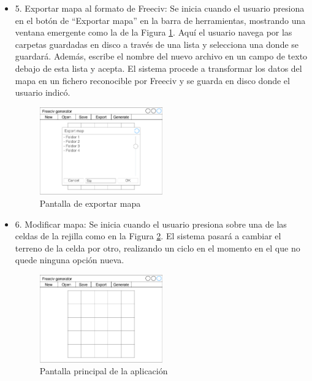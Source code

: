 \begin{itemize}
	\item 5. Exportar mapa al formato de Freeciv: Se inicia cuando el usuario presiona en el botón de ``Exportar mapa'' en la barra de herramientas, mostrando una ventana emergente como la de la Figura \ref{fig:exportmock}. Aquí el usuario navega por las carpetas guardadas en disco a través de una lista y selecciona una donde se guardará. Además, escribe el nombre del nuevo archivo en un campo de texto debajo de esta lista y acepta. El sistema procede a transformar los datos del mapa en un fichero reconocible por Freeciv y se guarda en disco donde el usuario indicó.
	
	\begin{figure}[!h]
		\centering
		\includegraphics[width=0.5\textwidth]{images/export-map.pdf}
		\caption{Pantalla de exportar mapa}
		\label{fig:exportmock}
	\end{figure}
	
	\item 6. Modificar mapa: Se inicia cuando el usuario presiona sobre una de las celdas de la rejilla como en la Figura \ref{fig:mainmock}. El sistema pasará a cambiar el terreno de la celda por otro, realizando un ciclo en el momento en el que no quede ninguna opción nueva.
	
	\begin{figure}[!h]
		\centering
		\includegraphics[width=0.5\textwidth]{images/aplicacion.pdf}
		\caption{Pantalla principal de la aplicación}
		\label{fig:mainmock}
	\end{figure}

\end{itemize}

